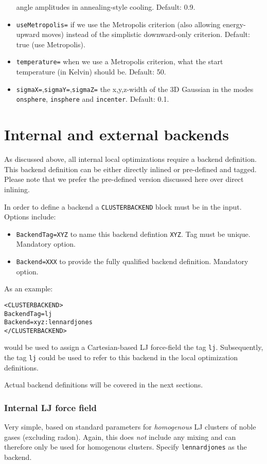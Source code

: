 \documentclass[a4paper,10pt]{scrbook}
\begin{document}
\begin{itemize}
  angle amplitudes in annealing-style cooling. Default: 0.9.
\item \texttt{useMetropolis=} if we use the Metropolis criterion (also allowing
  energy-upward moves) instead of the
  simplistic downward-only criterion. Default: true (use Metropolis).
\item \texttt{temperature=} when we use a Metropolis criterion, what the start
  temperature (in Kelvin) should be. Default: 50.
\item \texttt{sigmaX=},\texttt{sigmaY=},\texttt{sigmaZ=}  the x,y,z-width of
  the 3D Gaussian in the modes \texttt{onsphere}, \texttt{insphere} and
  \texttt{incenter}. Default: 0.1.  
\end{itemize}

\section{Internal and external backends}
As discussed above, all internal local optimizations require a backend 
definition. This backend definition can be
either directly inlined or pre-defined and tagged. Please note that we prefer 
the pre-defined version discussed
here over direct inlining.

In order to define a backend a \texttt{CLUSTERBACKEND} block must be in the 
input. Options include:
\begin{itemize}
 \item \texttt{BackendTag=XYZ} to name this backend defintion \texttt{XYZ}. Tag 
must be unique. Mandatory option.
 \item \texttt{Backend=XXX} to provide the fully qualified backend definition. 
Mandatory option.
\end{itemize}

As an example:
\begin{verbatim}
<CLUSTERBACKEND>
BackendTag=lj
Backend=xyz:lennardjones
</CLUSTERBACKEND>
\end{verbatim}
would be used to assign a Cartesian-based LJ force-field the tag \texttt{lj}. 
Subsequently, the tag \texttt{lj}
could be used to refer to this backend in the local optimization definitions.

Actual backend definitions will be covered in the next sections.

\subsubsection{Internal LJ force field}
Very simple, based on standard parameters for \emph{homogenous} LJ clusters of
noble gases (excluding radon). Again, this does \emph{not} include any mixing 
and can therefore only be used for
homogenous clusters. Specify \texttt{lennardjones} as the backend.
\end{document}
